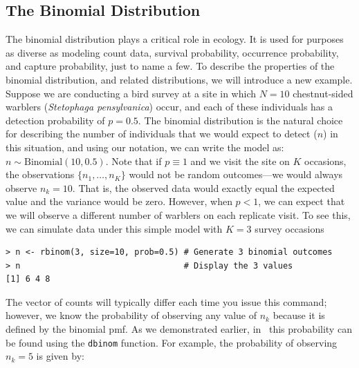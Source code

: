 \subsection{The Binomial Distribution}

The binomial distribution plays a critical role in ecology. It is
used for purposes as diverse as modeling count data, survival
probability, occurrence probability, and capture probability, just to
name a few.
To describe the properties of the binomial distribution, and related
distributions, we will introduce a new example.
Suppose we are conducting a bird survey at a site in which $N=10$
chestnut-sided warblers (\textit{Stetophaga pensylvanica}) occur, and
each of these individuals has a detection probability of $p=0.5$. The
binomial distribution is the natural choice for describing the number
of individuals that we would expect to detect ($n$) in this
situation, and using our notation, we can write the model as: $n \sim
\text{Binomial}(10, 0.5)$. Note that if $p \equiv 1$ and we visit the
site on $K$ occasions, the observations $\{n_1, \ldots, n_K\}$
would not be random outcomes---we would always observe
$n_k=10$. That is, the observed data would exactly equal the expected
value and the variance would be zero.
However, when $p<1$, we can expect that we will observe %
a different number of warblers on each replicate visit. To see this,
we can simulate data under this simple model with $K=3$ survey occasions
\begin{verbatim}
> n <- rbinom(3, size=10, prob=0.5) # Generate 3 binomial outcomes
> n                                 # Display the 3 values
[1] 6 4 8
\end{verbatim}
The vector of counts will typically differ each time you issue this
command; however, we know the probability of observing any value of
$n_k$ because it is defined by the binomial pmf. As we demonstrated
earlier, in \R~this probability can be found using the \verb+dbinom+
function. For example, the probability of observing $n_k=5$ is given by:


